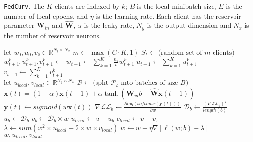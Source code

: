 \algrenewcommand\algorithmicfunction{}
\algrenewcommand\textproc{}
\begin{algorithm}[H]
\caption{\texttt{FedCurv}. The $K$ clients are indexed by $k$; $B$ is the local minibatch size, $E$ is the number of local epochs, and $\eta$ is the learning rate. Each client has the reservoir parameter $\textbf{W}_{in}$ and $\widehat{\textbf{W}}$, $\alpha$ is the leaky rate, $N_y$ is the output dimension and $N_x$ is the number of reservoir neurons.}\label{alg:fedcurv}
\begin{algorithmic}[1]
    \State let $w_0, u_0, v_0\in \mathbb{R}^{N_y\times N_x}$
        \State $m\leftarrow \max(C\cdot K, 1)$
        \State $S_t\leftarrow \text{(random set of $m$ clients)}$
            \State $w_{t+1}^k, u_{t+1}^k, v_{t+1}^k\leftarrow$ 
        \EndFor
        \State $w_{t+1}\leftarrow \sum_{k=1}^K\frac{n_k}{n}w_{t+1}^k$
        \State $u_{t+1}\leftarrow \sum_{k=1}^K u_{t+1}^k$
        \State $v_{t+1}\leftarrow \sum_{k=1}^K v_{t+1}^k$
    \EndFor
\EndFunction
\\
    \State let $u_{local}, v_{local}\in \mathbb{R}^{N_y\times N_x}$
    \State $\mathcal{B}\leftarrow \text{(split $\mathcal{P}_k$ into batches of size $B$)}$
            \State $\textbf{x}(t)=(1-\alpha)\textbf{x}(t-1)+\alpha \tanh(\textbf{W}_{in}b+\widehat{\textbf{W}}\textbf{x}(t-1))$
            \State $\textbf{y}(t)\leftarrow sigmoid(w\textbf{x}(t))$
            \State $\nabla\mathcal{LL}_b\leftarrow\frac{\partial log(softmax(\textbf{y}(t)))}{\partial w}$ 
            \State $\mathcal{D}_b\leftarrow\frac{(\nabla\mathcal{LL}_b)^{2}}{length(b)}$ 
            \State $u_b\leftarrow\mathcal{D}_b$
            \State $v_b\leftarrow\mathcal{D}_b\times w$
            \State $u_{local} \leftarrow u-u_b$
            \State $v_{local} \leftarrow v-v_b$
            \State $\lambda\leftarrow sum(w^2\times u_{local}-2\times w\times v_{local})$ 
            \State $w\leftarrow w-\eta\nabla[\ell(w;b)+\lambda]$
        \EndFor
    \EndFor
    \Return $w, u_{local}, v_{local}$
\EndFunction
\end{algorithmic}
\end{algorithm}


